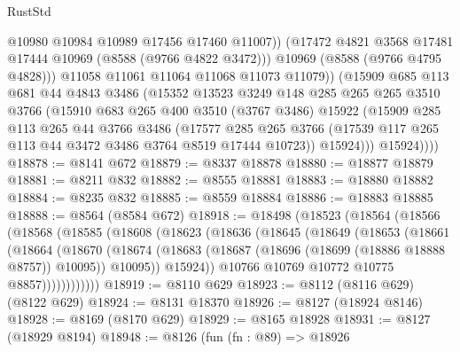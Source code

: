 \begin{lexlean}{RustStd}
\begin{coremodule}
                    @10980
                    @10984
                    @10989
                    @17456
                    @17460
                    @11007))
                (@17472 @4821 @3568 @17481 @17444 @10969 (@8588 (@9766 @4822 @3472)))
                @10969
                (@8588 (@9766 @4795 @4828)))
              @11058
              @11061
              @11064
              @11068
              @11073
              @11079))
          (@15909
            @685
            @113
            @681
            @44
            @4843
            @3486
            (@15352
              @13523
              @3249
              @148
              @285
              @265
              @265
              @3510
              @3766
              (@15910
                @683
                @265
                @400
                @3510
                (@3767 @3486)
                @15922
                (@15909
                  @285
                  @113
                  @265
                  @44
                  @3766
                  @3486
                  (@17577
                    @285
                    @265
                    @3766
                    (@17539 @117 @265 @113 @44 @3472 @3486 @3764 @8519 @17444 @10723))
                  @15924)))
            @15924))))
@18878 := @8141 @672
@18879 := @8337 @18878
@18880 := @18877 @18879
@18881 := @8211 @832
@18882 := @8555 @18881
@18883 := @18880 @18882
@18884 := @8235 @832
@18885 := @8559 @18884
@18886 := @18883 @18885
@18888 := @8564 (@8584 @672)
@18918 := @18498
    (@18523
      (@18564
        (@18566
          (@18568
            (@18585
              (@18608
                (@18623
                  (@18636
                    (@18645
                      (@18649
                        (@18653
                          (@18661
                            (@18664
                              (@18670
                                (@18674
                                  (@18683
                                    (@18687 (@18696 (@18699 (@18886 @18888 @8757)) @10095))
                                    @10095))
                                @15924))
                            @10766
                            @10769
                            @10772
                            @10775
                            @8857))))))))))))
@18919 := @8110 @629
@18923 := @8112 (@8116 @629) (@8122 @629)
@18924 := @8131 @18370
@18926 := @8127 (@18924 @8146)
@18928 := @8169 (@8170 @629)
@18929 := @8165 @18928
@18931 := @8127 (@18929 @8194)
@18948 := @8126
    (fun (fn : @89) =>
    @18926

\end{coremodule}
\end{lexlean}
